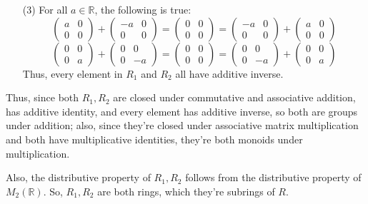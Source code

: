 \documentclass{article}
\begin{document}
\begin{itemize}
    \hfill
    
    \item[(3)] For all $a\in\mathbb{R}$, the following is true:
    $$\begin{pmatrix}
        a&0\\0&0
    \end{pmatrix}+\begin{pmatrix}
        -a&0\\0&0
    \end{pmatrix}=\begin{pmatrix}
        0&0\\0&0
    \end{pmatrix}=\begin{pmatrix}
        -a&0\\0&0
    \end{pmatrix}+\begin{pmatrix}
        a&0\\0&0
    \end{pmatrix}$$
    $$ \begin{pmatrix}
        0&0\\0&a
    \end{pmatrix}+\begin{pmatrix}
        0&0\\0&-a
    \end{pmatrix}=\begin{pmatrix}
        0&0\\0&0
    \end{pmatrix}=\begin{pmatrix}
        0&0\\0&-a
    \end{pmatrix}+\begin{pmatrix}
        0&0\\0&a
    \end{pmatrix}$$
    Thus, every element in $R_1$ and $R_2$ all have additive inverse.
\end{itemize}

Thus, since both $R_1,R_2$ are closed under commutative and associative addition, has additive identity, and every element has additive inverse,
so both are groups under addition; also, since they're closed under associative matrix multiplication and both have multiplicative identities, they're both monoids under multiplication.

Also, the distributive property of $R_1, R_2$ follows from the distributive property of $M_2(\mathbb{R})$. So, $R_1,R_2$ are both rings, which they're subrings of $R$.
\end{document}
